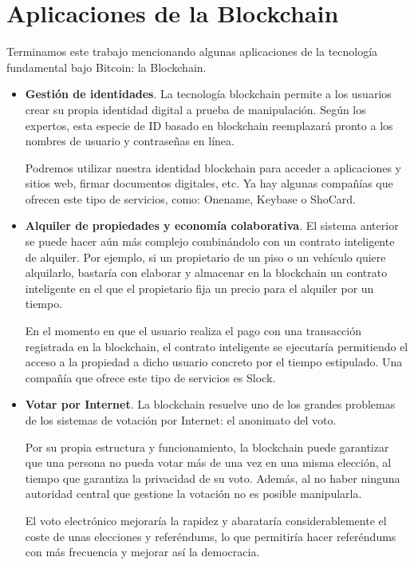 \documentclass[twoside]{article}
\theoremstyle{definition}
\begin{document}
\newpage 
\section{Aplicaciones de la Blockchain}
Terminamos este trabajo mencionando algunas aplicaciones de la tecnología fundamental bajo Bitcoin: la Blockchain. 
\begin{itemize}
\item \textbf{Gestión de identidades}. La tecnología blockchain permite a los usuarios crear su propia identidad digital a prueba de manipulación. Según los expertos, esta especie de ID basado en blockchain reemplazará pronto a los nombres de usuario y contraseñas en línea.

Podremos utilizar nuestra identidad blockchain para acceder a aplicaciones y sitios web, firmar documentos digitales, etc. Ya hay algunas compañías que ofrecen este tipo de servicios, como: Onename, Keybase o ShoCard.

\item \textbf{Alquiler de propiedades y economía colaborativa}. El sistema anterior se puede hacer aún más complejo combinándolo con un contrato inteligente de alquiler. Por ejemplo, si un propietario de un piso o un vehículo quiere alquilarlo, bastaría con elaborar y almacenar en la blockchain un contrato inteligente en el que el propietario fija un precio para el alquiler por un tiempo.

En el momento en que el usuario realiza el pago con una transacción registrada en la blockchain, el contrato inteligente se ejecutaría permitiendo el acceso a la propiedad a dicho usuario concreto por el tiempo estipulado. Una compañía que ofrece este tipo de servicios es Slock.

\item\textbf{Votar por Internet}. La blockchain resuelve uno de los grandes problemas de los sistemas de votación por Internet: el anonimato del voto.

Por su propia estructura y funcionamiento, la blockchain puede garantizar que una persona no pueda votar más de una vez en una misma elección, al tiempo que garantiza la privacidad de su voto. Además, al no haber ninguna autoridad central que gestione la votación no es posible manipularla.

El voto electrónico mejoraría la rapidez y abarataría considerablemente el coste de unas elecciones y referéndums, lo que permitiría hacer referéndums con más frecuencia y mejorar así la democracia.

\end{itemize}
\newpage
{}
\end{document}

